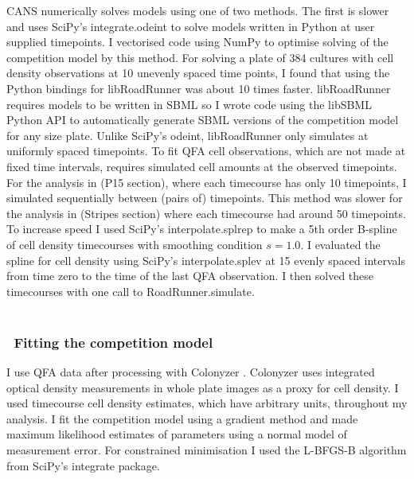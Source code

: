 CANS numerically solves models using one of two methods. The first is
slower and uses SciPy's integrate.odeint to solve models written in
Python at user supplied timepoints. I vectorised code using NumPy to
optimise solving of the competition model by this method. For solving
a plate of 384 cultures with cell density observations at 10 unevenly
spaced time points, I found that using the Python bindings for
libRoadRunner was about 10 times faster. libRoadRunner requires models
to be written in SBML so I wrote code using the libSBML Python API to
automatically generate SBML versions of the competition model for any
size plate.
Unlike SciPy's odeint, libRoadRunner only simulates at uniformly
spaced timepoints. To fit QFA cell observations, which are not made at
fixed time intervals, requires simulated cell amounts at the observed
timepoints. For the analysis in (P15 section), where each timecourse
has only 10 timepoints, I simulated sequentially between (pairs of)
timepoints. This method was slower for the analysis in (Stripes
section) where each timecourse had around 50 timepoints. To increase
speed I used SciPy's interpolate.splrep to make a 5th order B-spline
of cell density timecourses with smoothing condition \(s=1.0\). I
evaluated the spline for cell density using SciPy's interpolate.splev
at 15 evenly spaced intervals from time zero to the time of the last
QFA observation. I then solved these
timecourses with one call to RoadRunner.simulate.\\\\

\subsubsection{\thesubsubsection~Fitting the competition model}
\label{sec:fitting_comp}

I use QFA data after processing with Colonyzer \citep{Lawless2010}.
Colonyzer uses integrated optical density measurements in whole plate
images as a proxy for cell density. I used timecourse cell density
estimates, which have arbitrary units, throughout my analysis. I fit
the competition model using a gradient method and made maximum
likelihood estimates of parameters using a normal model of measurement
error. For constrained minimisation I used the L-BFGS-B algorithm from
SciPy's integrate package.

